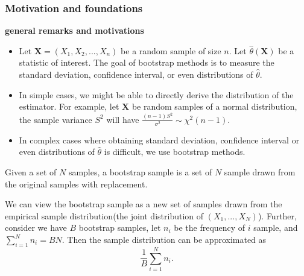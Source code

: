 \begin{refsection}
\subsubsection{Motivation and foundations}
\begin{mdframed}
	\textbf{general remarks and motivations}
	\begin{itemize}
		\item Let $\bm{X} = (X_1,X_2,...,X_n)$ be a random sample of size $n$. Let $\hat{\theta}(\bm{X})$ be a statistic of interest. The goal of bootstrap methods is to measure the standard deviation, confidence interval, or even distributions of $\hat{\theta}$. 
		\item In simple cases, we might be able to directly derive the distribution of the estimator. For example, let $\bm{X}$ be random samples of a normal distribution, the sample variance $S^2$ will have $\frac{(n-1)S^2}{\sigma^2} \sim \chi^2(n-1)$.
		\item In complex cases where obtaining  standard deviation, confidence interval or even distributions of $\hat{\theta}$ is difficult, we use bootstrap methods. 
	\end{itemize}
\end{mdframed}


\begin{definition}
Given a set of $N$ samples, a bootstrap sample is a set of $N$ sample drawn from the original samples with replacement.
\end{definition}


\begin{remark}\hfill
We can view the bootstrap sample as a new set of samples drawn from the empirical sample distribution(the joint distribution of $(X_1,...,X_N)$). Further, consider we have $B$ bootstrap samples, let $n_i$ be the frequency of $i$ sample, and $\sum_{i=1}^N n_i = BN$. Then the sample distribution can be approximated as
$$\frac{1}{B}\sum_{i=1}^N n_i.$$
\end{remark}



\end{refsection}
